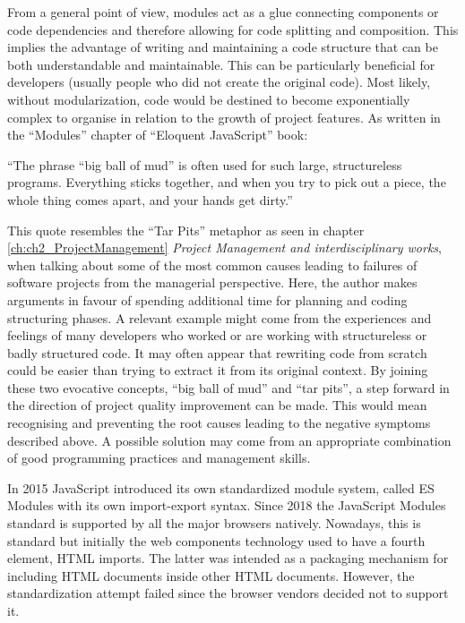 From a general point of view, modules act as a glue connecting components or code dependencies and therefore allowing for code splitting and composition. This implies the advantage of writing and maintaining a code structure that can be both understandable and maintainable. This can be particularly beneficial for developers (usually people who did not create the original code). Most likely, without modularization, code would be destined to become exponentially complex to organise in relation to the growth of project features.
As written in the “Modules” chapter of “Eloquent JavaScript” book:

\begin{displayquote}

“The phrase “big ball of mud” is often used for such large, structureless programs. Everything sticks together, and when you try to pick out a piece, the whole thing comes apart, and your hands get dirty.”

\end{displayquote}

This quote resembles the “Tar Pits” metaphor as seen in chapter \ref{ch:ch2_ProjectManagement} \emph{Project Management and interdisciplinary works}, when talking about some of the most common causes leading to failures of software projects from the managerial perspective. Here, the author makes arguments in favour of spending additional time for planning and coding structuring phases. A relevant example might come from the experiences and feelings of many developers who worked or are working with structureless or badly structured code. It may often appear that rewriting code from scratch could be easier than trying to extract it from its original context. 
By joining these two evocative concepts, “big ball of mud” and “tar pits”, a step forward in the direction of project quality improvement can be made. This would mean recognising and preventing the root causes leading to the negative symptoms described above. A possible solution may come from an appropriate combination of good programming practices and management skills.

In 2015 JavaScript introduced its own standardized module system, called ES Modules with its own import-export syntax. Since 2018 the JavaScript Modules standard is supported by all the major browsers natively. Nowadays, this is standard but initially the web components technology used to have a fourth element, HTML imports. The latter was intended as a packaging mechanism for including HTML documents inside other HTML documents. However, the standardization attempt failed since the browser vendors decided not to support it.

